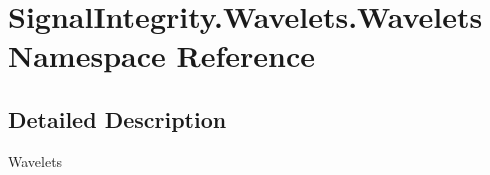 \hypertarget{namespaceSignalIntegrity_1_1Wavelets_1_1Wavelets}{}\section{Signal\+Integrity.\+Wavelets.\+Wavelets Namespace Reference}
\label{namespaceSignalIntegrity_1_1Wavelets_1_1Wavelets}


\subsection{Detailed Description}
\begin{DoxyVerb}Wavelets\end{DoxyVerb}
 